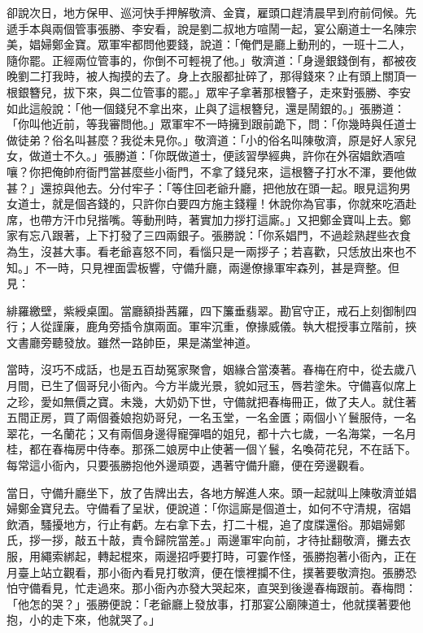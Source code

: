 卻說次日，地方保甲、巡河快手押解敬濟、金寶，雇頭口趕清晨早到府前伺候。先遞手本與兩個管事張勝、李安看，說是劉二叔地方喧鬧一起，宴公廟道士一名陳宗美，娼婦鄭金寶。眾軍牢都問他要錢，說道：「俺們是廳上動刑的，一班十二人，隨你罷。正經兩位管事的，你倒不可輕視了他。」敬濟道：「身邊銀錢倒有，都被夜晚劉二打我時，被人掏摸的去了。身上衣服都扯碎了，那得錢來？止有頭上關頂一根銀簪兒，拔下來，與二位管事的罷。」眾牢子拿著那根簪子，走來對張勝、李安如此這般說：「他一個錢兒不拿出來，止與了這根簪兒，還是鬧銀的。」張勝道：「你叫他近前，等我審問他。」眾軍牢不一時擁到跟前跪下，問：「你幾時與任道士做徒弟？俗名叫甚麼？我從未見你。」敬濟道：「小的俗名叫陳敬濟，原是好人家兒女，做道士不久。」張勝道：「你既做道士，便該習學經典，許你在外宿娼飲酒喧嚷？你把俺帥府衙門當甚麼些小衙門，不拿了錢兒來，這根簪子打水不渾，要他做甚？」還掠與他去。分付牢子：「等住回老爺升廳，把他放在頭一起。眼見這狗男女道士，就是個吝錢的，只許你白要四方施主錢糧！休說你為官事，你就來吃酒赴席，也帶方汗巾兒揩嘴。等動刑時，著實加力拶打這廝。」又把鄭金寶叫上去。鄭家有忘八跟著，上下打發了三四兩銀子。張勝說：「你系娼門，不過趁熟趕些衣食為生，沒甚大事。看老爺喜怒不同，看惱只是一兩拶子；若喜歡，只恁放出來也不知。」不一時，只見裡面雲板響，守備升廳，兩邊僚掾軍牢森列，甚是齊整。但見：

緋羅繳壁，紫綬桌圍。當廳額掛茜羅，四下簾垂翡翠。勘官守正，戒石上刻御制四行；人從謹廉，鹿角旁插令旗兩面。軍牢沉重，僚掾威儀。執大棍授事立階前，挾文書廳旁聽發放。雖然一路帥臣，果是滿堂神道。

當時，沒巧不成話，也是五百劫冤家聚會，姻緣合當湊著。春梅在府中，從去歲八月間，已生了個哥兒小衙內。今方半歲光景，貌如冠玉，唇若塗朱。守備喜似席上之珍，愛如無價之寶。未幾，大奶奶下世，守備就把春梅冊正，做了夫人。就住著五間正房，買了兩個養娘抱奶哥兒，一名玉堂，一名金匱；兩個小丫鬟服侍，一名翠花，一名蘭花；又有兩個身邊得寵彈唱的姐兒，都十六七歲，一名海棠，一名月桂，都在春梅房中侍奉。那孫二娘房中止使著一個丫鬟，名喚荷花兒，不在話下。每常這小衙內，只要張勝抱他外邊頑耍，遇著守備升廳，便在旁邊觀看。

當日，守備升廳坐下，放了告牌出去，各地方解進人來。頭一起就叫上陳敬濟並娼婦鄭金寶兒去。守備看了呈狀，便說道：「你這廝是個道士，如何不守清規，宿娼飲酒，騷擾地方，行止有虧。左右拿下去，打二十棍，追了度牒還俗。那娼婦鄭氏，拶一拶，敲五十敲，責令歸院當差。」兩邊軍牢向前，才待扯翻敬濟，攤去衣服，用繩索綁起，轉起棍來，兩邊招呼要打時，可霎作怪，張勝抱著小衙內，正在月臺上站立觀看，那小衙內看見打敬濟，便在懷裡攔不住，撲著要敬濟抱。張勝恐怕守備看見，忙走過來。那小衙內亦發大哭起來，直哭到後邊春梅跟前。春梅問：「他怎的哭？」張勝便說：「老爺廳上發放事，打那宴公廟陳道士，他就撲著要他抱，小的走下來，他就哭了。」

